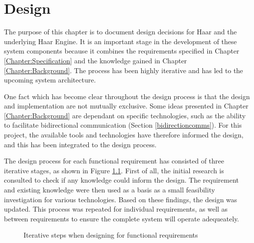 \chapter{Design}
   The purpose of this chapter is to document design decisions for Haar and the underlying Haar Engine. It is an important stage in the development of these system components because it combines the requirements specified in Chapter \ref{Chapter:Specification} and the knowledge gained in Chapter \ref{Chapter:Background}. The process has been highly iterative and has led to the upcoming system architecture. 

   One fact which has become clear throughout the design process is that the design and implementation are not mutually exclusive. Some ideas presented in Chapter \ref{Chapter:Background} are dependant on specific technologies, such as the ability to facilitate bidirectional communication (Section \ref{bidirectioncomms}). For this project, the available tools and technologies have therefore informed the design, and this has been integrated to the design process.

   The design process for each functional requirement has consisted of three iterative stages, as shown in Figure \ref{figure:design-process}. First of all, the initial research is consulted to check if any knowledge could inform the design. The requirement and existing knowledge were then used as a basis as a small feasibility investigation for various technologies. Based on these findings, the design was updated. This process was repeated for individual requirements, as well as between requirements to ensure the complete system will operate adequeately.

   \begin{figure}
    \centering
    \caption{Iterative steps when designing for functional requirements}\label{figure:design-process}
  \end{figure}

